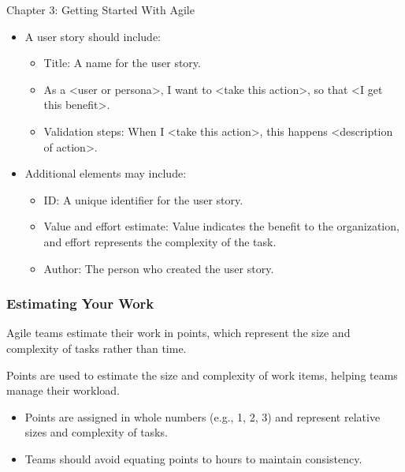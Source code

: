 \begin{notes}{Chapter 3: Getting Started With Agile}
\begin{highlight}
        \begin{itemize}
            \item A user story should include:
            \begin{itemize}
                \item Title: A name for the user story.
                \item As a <user or persona>, I want to <take this action>, so that <I get this benefit>.
                \item Validation steps: When I <take this action>, this happens <description of action>.
            \end{itemize}
            \item Additional elements may include:
            \begin{itemize}
                \item ID: A unique identifier for the user story.
                \item Value and effort estimate: Value indicates the benefit to the organization, and effort represents the complexity of the task.
                \item Author: The person who created the user story.
            \end{itemize}
        \end{itemize}
    
    \end{highlight}
    
    \subsubsection*{Estimating Your Work}
    
    Agile teams estimate their work in points, which represent the size and complexity of tasks rather than time.
    
    \begin{highlight}
    
        Points are used to estimate the size and complexity of work items, helping teams manage their workload.
        
        \begin{itemize}
            \item Points are assigned in whole numbers (e.g., 1, 2, 3) and represent relative sizes and complexity of tasks.
            \item Teams should avoid equating points to hours to maintain consistency.
        \end{itemize}
    

\end{highlight}
\end{notes}
